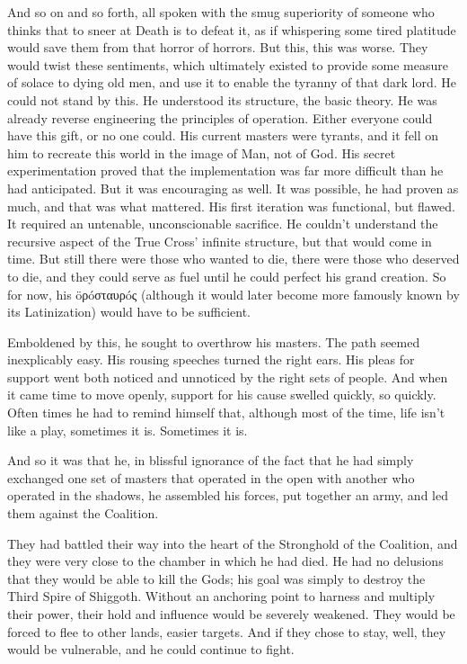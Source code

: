 \SmallVSpace
And so on and so forth, all spoken with the smug superiority of someone who thinks that to sneer at Death is to defeat it, as if whispering some tired platitude would save them from that horror of horrors. But this, this was worse. They would twist these sentiments, which ultimately existed to provide some measure of solace to dying old men, and use it to enable the tyranny of that dark lord.
\SmallVSpace
He could not stand by this. He understood its structure, the basic theory. He was already reverse engineering the principles of operation. Either everyone could have this gift, or no one could. His current masters were tyrants, and it fell on him to recreate this world in the image of Man, not of God.
\SmallVSpace
His secret experimentation proved that the implementation was far more difficult than he had anticipated. But it was encouraging as well. It was possible, he had proven as much, and that was what mattered. His first iteration was functional, but flawed. It required an untenable, unconscionable sacrifice. He couldn’t understand the recursive aspect of the True Cross’ infinite structure, but that would come in time. But still there were those who wanted to die, there were those who deserved to die, and they could serve as fuel until he could perfect his grand creation. So for now, his öρóσταυρóς (although it would later become more famously known by its Latinization) would have to be sufficient.

Emboldened by this, he sought to overthrow his masters. The path seemed inexplicably easy. His rousing speeches turned the right ears. His pleas for support went both noticed and unnoticed by the right sets of people. And when it came time to move openly, support for his cause swelled quickly, so quickly. Often times he had to remind himself that, although most of the time, life isn’t like a play, sometimes it is. Sometimes it is.

And so it was that he, in blissful ignorance of the fact that he had simply exchanged one set of masters that operated in the open with another who operated in the shadows, he assembled his forces, put together an army, and led them against the Coalition.

They had battled their way into the heart of the Stronghold of the Coalition, and they were very close to the chamber in which he had died. He had no delusions that they would be able to kill the Gods; his goal was simply to destroy the Third Spire of Shiggoth. Without an anchoring point to harness and multiply their power, their hold and influence would be severely weakened. They would be forced to flee to other lands, easier targets. And if they chose to stay, well, they would be vulnerable, and he could continue to fight.

